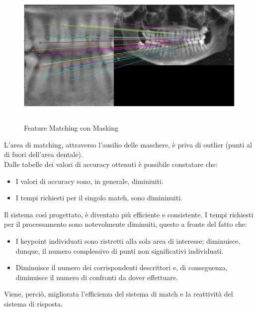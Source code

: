 \documentclass[12pt,a4paper,openright,twoside]{book}
\begin{document}
\begin{figure}[H]
	\centering
	\includegraphics[width=15cm,height=7cm]{figures/matchmask.pdf}
    	\caption{Feature Matching con Masking}
	\label{fig:matchmask}
\end{figure}

L'area di matching, attraverso l'ausilio delle maschere, è priva di outlier (punti al di fuori dell'area dentale).\\

Dalle tabelle dei valori di accuracy ottenuti è possibile constatare che:
\begin{itemize}
\item I valori di accuracy sono, in generale, diminiuiti.
\item I tempi richiesti per il singolo match, sono dimininuiti.
\end{itemize}

Il sistema così progettato, è diventato più efficiente e consistente. I tempi richiesti per il processamento sono notevolmente diminuiti, questo a fronte del fatto che:
\begin{itemize}
\item I keypoint individuati sono ristretti alla sola area di interesse; diminuisce, dunque, il numero complessivo di punti non significativi individuati.
\item Diminuisce il numero dei corrispondenti descrittori e, di conseguenza, diminuisce il numero di confronti da dover effettuare.
\end{itemize}
Viene, perciò, migliorata l'efficienza del sistema di match e la reattività del sistema di risposta.\\
\end{document}
